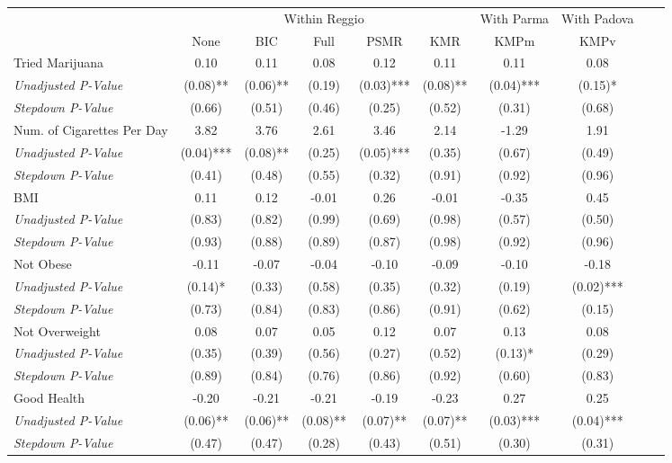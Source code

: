 \begin{tabular}{l c c c c c c c c c}
\toprule
& \multicolumn{5}{c}{Within Reggio} & With Parma & With Padova \\\cmidrule(lr){2-6} \cmidrule(lr){7} \cmidrule(lr){8}
 & None & BIC & Full & PSMR & KMR & KMPm & KMPv \\
\midrule
Tried Marijuana & 0.10 & 0.11 & 0.08 & 0.12 & 0.11 & 0.11 & 0.08 \\
\quad \textit{Unadjusted P-Value} & (0.08)** & (0.06)** & (0.19) & (0.03)*** & (0.08)** & (0.04)*** & (0.15)* \\
\quad \textit{Stepdown P-Value} & (0.66) & (0.51) & (0.46) & (0.25) & (0.52) & (0.31) & (0.68) \\
Num. of Cigarettes Per Day & 3.82 & 3.76 & 2.61 & 3.46 & 2.14 & -1.29 & 1.91 \\
\quad \textit{Unadjusted P-Value} & (0.04)*** & (0.08)** & (0.25) & (0.05)*** & (0.35) & (0.67) & (0.49) \\
\quad \textit{Stepdown P-Value} & (0.41) & (0.48) & (0.55) & (0.32) & (0.91) & (0.92) & (0.96) \\
BMI & 0.11 & 0.12 & -0.01 & 0.26 & -0.01 & -0.35 & 0.45 \\
\quad \textit{Unadjusted P-Value} & (0.83) & (0.82) & (0.99) & (0.69) & (0.98) & (0.57) & (0.50) \\
\quad \textit{Stepdown P-Value} & (0.93) & (0.88) & (0.89) & (0.87) & (0.98) & (0.92) & (0.96) \\
Not Obese & -0.11 & -0.07 & -0.04 & -0.10 & -0.09 & -0.10 & -0.18 \\
\quad \textit{Unadjusted P-Value} & (0.14)* & (0.33) & (0.58) & (0.35) & (0.32) & (0.19) & (0.02)*** \\
\quad \textit{Stepdown P-Value} & (0.73) & (0.84) & (0.83) & (0.86) & (0.91) & (0.62) & (0.15) \\
Not Overweight & 0.08 & 0.07 & 0.05 & 0.12 & 0.07 & 0.13 & 0.08 \\
\quad \textit{Unadjusted P-Value} & (0.35) & (0.39) & (0.56) & (0.27) & (0.52) & (0.13)* & (0.29) \\
\quad \textit{Stepdown P-Value} & (0.89) & (0.84) & (0.76) & (0.86) & (0.92) & (0.60) & (0.83) \\
Good Health & -0.20 & -0.21 & -0.21 & -0.19 & -0.23 & 0.27 & 0.25 \\
\quad \textit{Unadjusted P-Value} & (0.06)** & (0.06)** & (0.08)** & (0.07)** & (0.07)** & (0.03)*** & (0.04)*** \\
\quad \textit{Stepdown P-Value} & (0.47) & (0.47) & (0.28) & (0.43) & (0.51) & (0.30) & (0.31) \\

\end{tabular}
